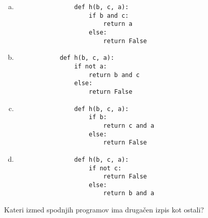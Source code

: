 \documentclass[arhiv, 10pt]{../izpit}
\begin{document}
        \begin{multicols}{2}
        \begin{enumerate}[(a)]
\item 
                \begin{verbatim}
                def h(b, c, a):
                    if b and c:
                        return a
                    else:
                        return False
                \end{verbatim}
            
\item 
            \begin{verbatim}
            def h(b, c, a):
                if not a:
                    return b and c
                else:
                    return False
            \end{verbatim}
        
\item 
                \begin{verbatim}
                def h(b, c, a):
                    if b:
                        return c and a
                    else:
                        return False
                \end{verbatim}
            
\item 
                \begin{verbatim}
                def h(b, c, a):
                    if not c:
                        return False
                    else:
                        return b and a
                \end{verbatim}
            
\end{enumerate}

        \end{multicols}
    
        \naloga*
        
        Kateri izmed spodnjih programov ima drugačen izpis kot ostali?
    
\end{document}
